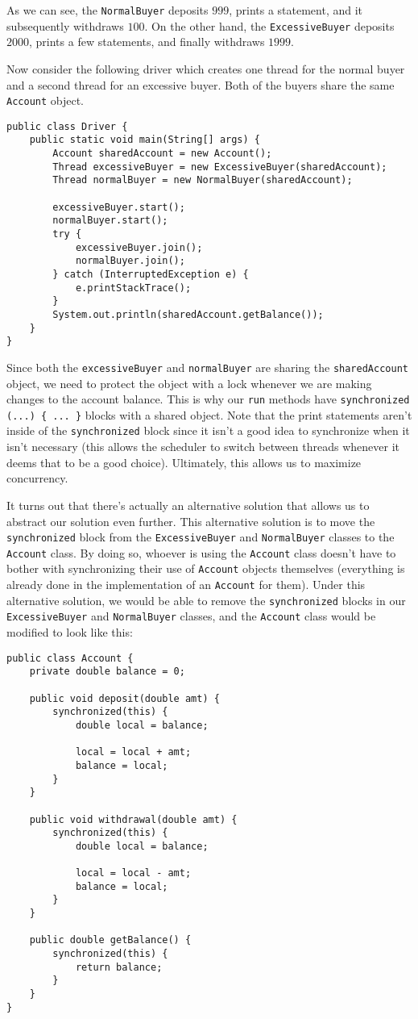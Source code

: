 As we can see, the \verb!NormalBuyer! deposits $999$, prints a statement, and it subsequently withdraws $100$. On the other hand, the \verb!ExcessiveBuyer! deposits $2000$, prints a few statements, and finally withdraws $1999$. 

Now consider the following driver which creates one thread for the normal buyer and a second thread for an excessive buyer. Both of the buyers share the same \verb!Account! object.

\begin{lstlisting}
public class Driver {
	public static void main(String[] args) {
		Account sharedAccount = new Account();
		Thread excessiveBuyer = new ExcessiveBuyer(sharedAccount);
		Thread normalBuyer = new NormalBuyer(sharedAccount);
		
		excessiveBuyer.start();
		normalBuyer.start();
		try {
			excessiveBuyer.join();
			normalBuyer.join();
		} catch (InterruptedException e) {
			e.printStackTrace();
		}
		System.out.println(sharedAccount.getBalance());
	}
}
\end{lstlisting}

Since both the \verb!excessiveBuyer! and \verb!normalBuyer! are sharing the \verb!sharedAccount! object, we need to protect the object with a lock whenever we are making changes to the account balance. This is why our \verb!run! methods have \verb!synchronized (...) { ... }! blocks with a shared object. Note that the print statements aren't inside of the \verb!synchronized! block since it isn't a good idea to synchronize when it isn't necessary (this allows the scheduler to switch between threads whenever it deems that to be a good choice). Ultimately, this allows us to maximize concurrency. 


It turns out that there's actually an alternative solution that allows us to abstract our solution even further. This alternative solution is to move the \verb!synchronized! block from the \verb!ExcessiveBuyer! and \verb!NormalBuyer! classes to the \verb!Account! class. By doing so, whoever is using the \verb!Account! class doesn't have to bother with synchronizing their use of \verb!Account! objects themselves (everything is already done in the implementation of an \verb!Account! for them). Under this alternative solution, we would be able to remove the \verb!synchronized! blocks in our \verb!ExcessiveBuyer! and \verb!NormalBuyer! classes, and the \verb!Account! class would be modified to look like this:

\begin{lstlisting}
public class Account {
	private double balance = 0;
	
	public void deposit(double amt) {
		synchronized(this) {
			double local = balance;
			
			local = local + amt;
			balance = local;
		}
	}

	public void withdrawal(double amt) {
		synchronized(this) {
			double local = balance;
			
			local = local - amt;
			balance = local;
		}
	}
	
	public double getBalance() {
		synchronized(this) {
			return balance;
		}
	}
}
\end{lstlisting}

